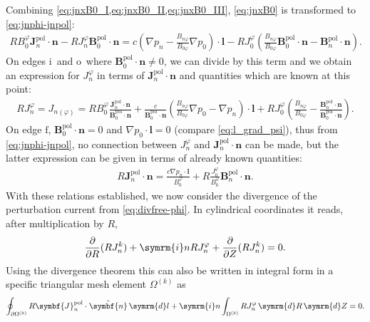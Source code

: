 \documentclass[a4paper, twoside, 10pt, english]{article}
\numberwithin{equation}{section}
\let\temp\varrho
\let\varrho\rho
\let\rho\temp
\let\temp\vartheta
\let\vartheta\theta
\let\theta\temp
\let\temp\varphi
\let\varphi\phi
\let\phi\temp
\let\vec\symbf
\newcommand*\grad{\ensuremath{\nabla}}
\newcommand*\diff{\ensuremath{\symrm{d}}}  %
\newcommand*\im{\ensuremath{\symrm{i}}}  %
\newcommand*\pd[2][]{\ensuremath{\frac{\partial #1}{\partial #2}}}  %
\newcommand*\pol{\ensuremath{\textrm{pol}}}  %
\newcommand*\fs{\ensuremath{\textrm{f}}}  %
\newcommand*\inw{\ensuremath{\textrm{i}}}  %
\newcommand*\out{\ensuremath{\textrm{o}}}  %
\begin{document}
Combining \cref{eq:jnxB0_I,eq:jnxB0_II,eq:jnxB0_III}, \cref{eq:jnxB0} is transformed to \cref{eq:jnphi-jnpol}:
\begin{gather}
  R B_{0}^{\phi} \vec{J}_{n}^{\pol} \cdot \vec{n} - R J_{n}^{\phi} \vec{B}_{0}^{\pol} \cdot \vec{n} = c \left ( \grad p_{n} - \frac{B_{n \phi}}{B_{0 \phi}} \grad p_{0} \right ) \cdot \vec{l} - R J_{0}^{\phi} \left ( \frac{B_{n \phi}}{B_{0 \phi}} \vec{B}_{0}^{\pol} \cdot \vec{n} - \vec{B}_{n}^{\pol} \cdot \vec{n} \right ). \label{eq:jnphi-jnpol}
\end{gather}
On edges \inw\ and \out\ where $\vec{B}_{0}^{\pol} \cdot \vec{n} \neq 0$, we can divide by this term and we obtain an expression for $J_{n}^{\phi}$ in terms of $\vec{J}_{n}^{\pol} \cdot \vec{n}$ and quantities which are known at this point:
\begin{gather}
  R J_{n}^{\phi} = J_{n (\phi)} = R B_{0}^{\phi} \frac{\vec{J}_{n}^{\pol} \cdot \vec{n}}{\vec{B}_{0}^{\pol} \cdot \vec{n}} + \frac{c}{\vec{B}_{0}^{\pol} \cdot \vec{n}} \left ( \frac{B_{n \phi}}{B_{0 \phi}} \grad p_{0} - \grad p_{n} \right ) \cdot \vec{l} + R J_{0}^{\phi} \left ( \frac{B_{n \phi}}{B_{0 \phi}} - \frac{\vec{B}_{n}^{\pol} \cdot \vec{n}}{\vec{B}_{0}^{\pol} \cdot \vec{n}} \right ). \label{eq:jnphi}
\end{gather}
On edge \fs, $\vec{B}_{0}^{\pol} \cdot \vec{n} = 0$ and $\grad p_{0} \cdot \vec{l} = 0$ (compare \cref{eq:l_grad_psi}), thus from \cref{eq:jnphi-jnpol}, no connection between $J_{n}^{\phi}$ and $\vec{J}_{n}^{\pol} \cdot \vec{n}$ can be made, but the latter expression can be given in terms of already known quantities:
\begin{gather}
  R \vec{J}_{n}^{\pol} \cdot \vec{n} = \frac{c \grad p_{n} \cdot \vec{l}}{B_{0}^{\phi}} + R \frac{J_{0}^{\phi}}{B_{0}^{\phi}} \vec{B}_{n}^{\pol} \cdot \vec{n}. \label{eq:If}
\end{gather}
With these relations established, we now consider the divergence of the perturbation current from \cref{eq:divfree-phi}. In cylindrical coordinates it reads, after multiplication by $R$,
\begin{gather}
  \pd{R} (R J_{n}^{k}) + \im n R J_{n}^{\phi} + \pd{Z} (R J_{n}^{k}) = 0.
\end{gather}
Using the divergence theorem this can also be written in integral form in a specific triangular mesh element $\Omega^{(k)}$ as
\begin{gather}
  \oint_{\partial \Omega^{(k)}} R \vec{J}_{n}^{\pol} \cdot \hat{\vec{n}} \, \diff l + \im n \int_{\Omega^{(k)}} R J_{n}^{\phi} \, \diff R \, \diff Z = 0.
\end{gather}
\end{document}
